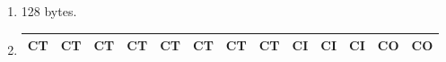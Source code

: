 \documentclass{article}
\begin{document}
\begin{enumerate}[label=\textbf{\Alph*.}]
	\item 128 bytes.
	\item
	\begin{tabular}{|c|c|c|c|c|c|c|c|c|c|c|c|c|}
		\hline
		CT & CT & CT & CT & CT & CT & CT & CT & CI & CI & CI & CO & CO \\
		\hline
	\end{tabular}
\end{enumerate}
\end{document}
